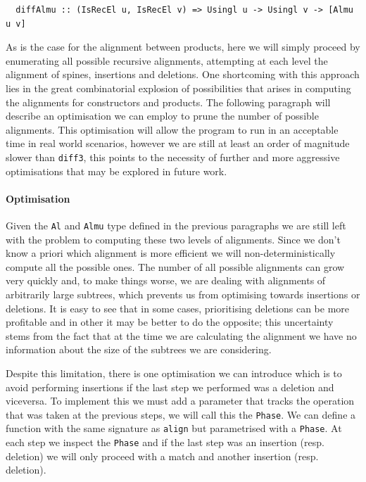 \documentclass[11pt]{article}
\begin{document}
\begin{lstlisting}
  diffAlmu :: (IsRecEl u, IsRecEl v) => Usingl u -> Usingl v -> [Almu u v]
\end{lstlisting}

As is the case for the alignment between products, here we will simply proceed 
by enumerating all possible recursive alignments, attempting at each level 
the alignment of spines, insertions and deletions.
One shortcoming with this approach lies in the great combinatorial 
explosion of possibilities that arises in computing the alignments for 
constructors and products. The following paragraph will describe an optimisation 
we can employ to prune the number of possible alignments. This optimisation 
will allow the program to run in an acceptable time in real world scenarios, however 
we are still at least an order of magnitude slower than \texttt{diff3}, this points to 
the necessity of further and more aggressive optimisations that may be explored 
in future work.

\paragraph{Optimisation}\label{optimisations}

Given the \texttt{Al} and \texttt{Almu} type defined in the previous paragraphs we are still left with the problem
to computing these two levels of alignments. Since we don't know a priori which alignment
is more efficient we will non-deterministically compute all the possible ones. The number of all possible alignments  
can grow very quickly and, to make things worse, we are dealing with alignments of arbitrarily large subtrees, which prevents
us from optimising towards insertions or deletions. It is easy to see
that in some cases, prioritising deletions can be more profitable and in
other it may be better to do the opposite; this uncertainty stems from
the fact that at the time we are calculating the alignment we have no
information about the size of the subtrees we are considering.

Despite this limitation, there is one optimisation we can introduce which is to 
avoid performing insertions if the last step we performed was a deletion and
viceversa.
To implement this we must add a parameter that tracks the operation that
was taken at the previous steps, we will call this the \texttt{Phase}. We
can define a function with the same signature as
\texttt{align} but parametrised with a \texttt{Phase}. At each step we inspect 
the \texttt{Phase} and if the last step was an insertion (resp. deletion) we 
will only proceed with a match and another insertion (resp. deletion). 
\end{document}
